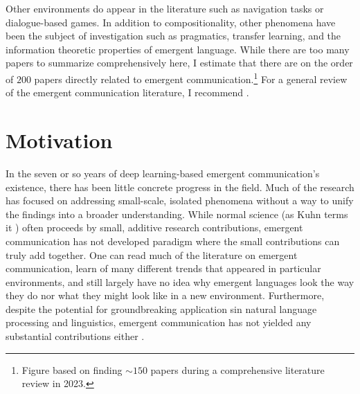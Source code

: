 Other environments do appear in the literature such as navigation tasks or dialogue-based games.
In addition to compositionality, other phenomena have been the subject of investigation such as pragmatics, transfer learning, and the information theoretic properties of emergent language.
While there are too many papers to summarize comprehensively here, I estimate that there are on the order of $200$ papers directly related to emergent communication.\footnote{Figure based on finding ${\sim}150$ papers during a comprehensive literature review in 2023.}
For a general review of the emergent communication literature, I recommend \citet{lazaridou2020emergentmultiagentcommunicationdeep}.

\section{Motivation}

In the seven or so years of deep learning-based emergent communication's existence, there has been little concrete progress in the field.
Much of the research has focused on addressing small-scale, isolated phenomena without a way to unify the findings into a broader understanding.
While normal science (as Kuhn terms it \citep{kuhn}) often proceeds by small, additive research contributions, emergent communication has not developed paradigm where the small contributions can truly add together.
One can read much of the literature on emergent communication, learn of many different trends that appeared in particular environments, and still largely have no idea why emergent languages look the way they do nor what they might look like in a new environment.
Furthermore, despite the potential for groundbreaking application sin natural language processing and linguistics, emergent communication has not yielded any substantial contributions either .

